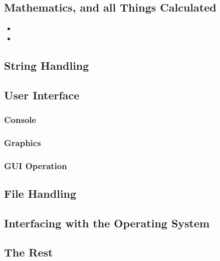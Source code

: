 \subsection{Mathematics, and all Things Calculated}

\begin{itemize}
\item {}
\item {}
\end{itemize}

\subsection{String Handling}

\subsection{User Interface}


\subsubsection{Console}

\subsubsection{Graphics}



\subsubsection{GUI Operation}



\subsection{File Handling}

\subsection{Interfacing with the Operating System}

\subsection{The Rest}


